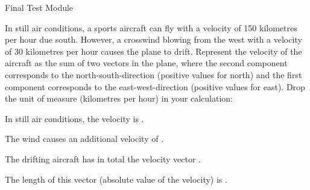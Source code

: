 \begin{MTest}{Final Test Module }
\begin{MExercise}
In still air conditions, a sports aircraft can fly with a velocity of 150 kilometres per hour due south. However, a crosswind blowing from the west with a velocity of 30 kilometres per hour causes the plane to drift. Represent the velocity of the aircraft as the sum of two vectors in the plane, where 
the second component corresponds to the north-south-direction (positive values for north) and 
the first component corresponds to the east-west-direction (positive values for east). Drop the 
unit of measure (kilometres per hour) in your calculation:
\begin{MExerciseItems}
\item{In still air conditions, the velocity is .}
\item{The wind causes an additional velocity of .}
\item{The drifting aircraft has in total the velocity vector .}
\item{The length of this vector (absolute value of the velocity) is .\\
}
\end{MExerciseItems}
\end{MExercise}


\end{MTest}

